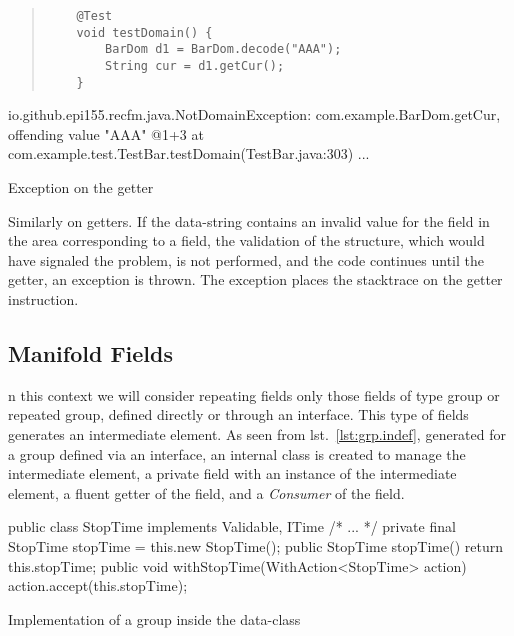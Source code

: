 \begin{elisting}[!htb]
\begin{quote}
\begin{verbatim}
    @Test
    void testDomain() {
        BarDom d1 = BarDom.decode("AAA");
        String cur = d1.getCur();
    }
\end{verbatim}
\end{quote}
\vspace*{-1cm}
\begin{javacode}
io.github.epi155.recfm.java.NotDomainException: com.example.BarDom.getCur, offending value "AAA" @1+3
	at com.example.test.TestBar.testDomain(TestBar.java:303)
	...
\end{javacode}
\caption{Exception on the getter}
\label{lst:get.throw}
\end{elisting}
Similarly on getters. If the data-string contains an invalid value for the field 
in the area corresponding to a field, the validation of the structure, which 
would have signaled the problem, is not performed, and the code continues until 
the getter, an exception is thrown. The exception places the stacktrace on the 
getter instruction.

\subsection{Manifold Fields}
n this context we will consider repeating fields only those fields of type group 
or repeated group, defined directly or through an interface. 
This type of fields generates an intermediate element. 
As seen from lst.~\ref{lst:grp.indef}, generated for a group defined via an 
interface, an internal class is created to manage the intermediate element, a 
private field with an instance of the intermediate element, a fluent getter of 
the field, and a \textit{Consumer} of the field.

\begin{elisting}[!htb]
\begin{javacode}
    public class StopTime implements Validable, ITime {/* ... */}
    private final StopTime stopTime = this.new StopTime();
    public StopTime stopTime() { return this.stopTime; }
    public void withStopTime(WithAction<StopTime> action) { action.accept(this.stopTime); }
\end{javacode}
\caption{Implementation of a group inside the data-class}
\label{lst:grp.indef}
\end{elisting}

